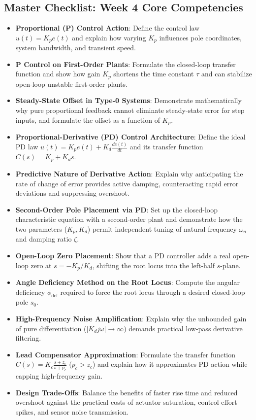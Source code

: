 \documentclass[12pt,onecolumn,twoside ]{article}
\begin{document}
	\subsection{Master Checklist: Week 4 Core Competencies}
	\begin{itemize}
		\item[$\square$]
		\textbf{Proportional (P) Control Action}: Define the control law $u(t) = K_p e(t)$ and explain how varying $K_p$ influences pole coordinates, system bandwidth, and transient speed.
		\item[$\square$]
		\textbf{P Control on First-Order Plants}: Formulate the closed-loop transfer function and show how gain $K_p$ shortens the time constant $\tau$ and can stabilize open-loop unstable first-order plants.
		\item[$\square$]
		\textbf{Steady-State Offset in Type-0 Systems}: Demonstrate mathematically why pure proportional feedback cannot eliminate steady-state error for step inputs, and formulate the offset as a function of $K_p$.
		\item[$\square$]
		\textbf{Proportional-Derivative (PD) Control Architecture}: Define the ideal PD law $u(t) = K_p e(t) + K_d \frac{de(t)}{dt}$ and its transfer function $C(s) = K_p + K_d s$.
		\item[$\square$]
		\textbf{Predictive Nature of Derivative Action}: Explain why anticipating the rate of change of error provides active damping, counteracting rapid error deviations and suppressing overshoot.
		\item[$\square$]
		\textbf{Second-Order Pole Placement via PD}: Set up the closed-loop characteristic equation with a second-order plant and demonstrate how the two parameters ($K_p, K_d$) permit independent tuning of natural frequency $\omega_n$ and damping ratio $\zeta$.
		\item[$\square$]
		\textbf{Open-Loop Zero Placement}: Show that a PD controller adds a real open-loop zero at $s = -K_p / K_d$, shifting the root locus into the left-half $s$-plane.
		\item[$\square$]
		\textbf{Angle Deficiency Method on the Root Locus}: Compute the angular deficiency $\phi_{\text{def}}$ required to force the root locus through a desired closed-loop pole $s_0$.
		\item[$\square$]
		\textbf{High-Frequency Noise Amplification}: Explain why the unbounded gain of pure differentiation ($|K_d j\omega| \to \infty$) demands practical low-pass derivative filtering.
		\item[$\square$]
		\textbf{Lead Compensator Approximation}: Formulate the transfer function $C(s) = K_c \frac{s + z_c}{s + p_c}$ ($p_c > z_c$) and explain how it approximates PD action while capping high-frequency gain.
		\item[$\square$]
		\textbf{Design Trade-Offs}: Balance the benefits of faster rise time and reduced overshoot against the practical costs of actuator saturation, control effort spikes, and sensor noise transmission.
	\end{itemize}
	
\end{document}

